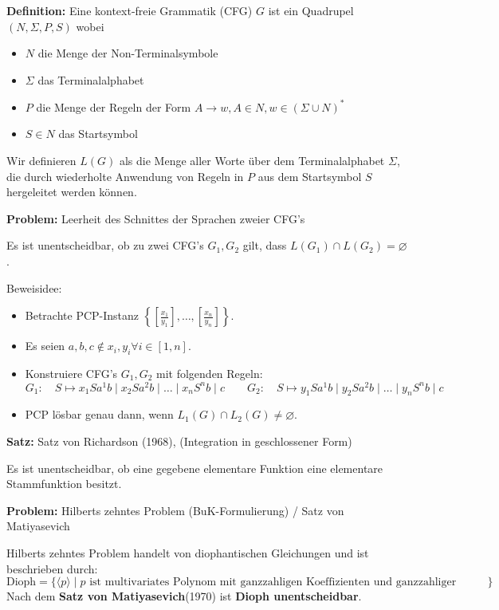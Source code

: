 \documentclass[a4paper,graphics,11pt]{article}
\newcommand{\godel}[1]{\langle #1 \rangle}
\begin{document}
\textbf{Definition:} Eine kontext-freie Grammatik (CFG) $G$ ist ein Quadrupel $(N, \Sigma, P, S)$
wobei
\begin{itemize}
    \item $N$ die Menge der Non-Terminalsymbole
    \item $\Sigma$ das Terminalalphabet
    \item $P$ die Menge der Regeln der Form $A \to w, A \in N, w \in (\Sigma \cup N)^*$
    \item $S \in N$ das Startsymbol
\end{itemize}

Wir definieren $L(G)$ als die Menge aller Worte über dem Terminalalphabet $\Sigma$, die
durch wiederholte Anwendung von Regeln in $P$ aus dem Startsymbol $S$ hergeleitet werden können.

\strut

\textbf{Problem:} Leerheit des Schnittes der Sprachen zweier CFG's

Es ist unentscheidbar, ob zu zwei CFG's $G_1,G_2$ gilt, dass $L(G_1) \cap L(G_2) = \varnothing$.

Beweisidee:
\begin{itemize}
    \item Betrachte PCP-Instanz
        $\displaystyle\left\{\left[\frac{x_1}{y_1}\right],\dots,\left[\frac{x_n}{y_n} \right]\right\}$.\\
    \item Es seien $a,b,c \notin x_i,y_i \forall i \in [1,n]$.
    \item Konstruiere CFG's $G_1,G_2$ mit folgenden Regeln:
        $$
            G_1:\quad S\mapsto x_1Sa^1b \mid x_2 Sa^2b \mid \dots \mid x_n S^nb \mid c
            \qquad
            G_2:\quad S\mapsto y_1Sa^1b \mid y_2 Sa^2b \mid \dots \mid y_n S^nb \mid c
        $$
    \item PCP lösbar genau dann, wenn $L_1(G) \cap L_2(G) \neq \varnothing$.
\end{itemize}

\newpage

\textbf{Satz:} Satz von Richardson (1968), (Integration in geschlossener Form)

Es ist unentscheidbar, ob eine gegebene elementare Funktion eine elementare Stammfunktion besitzt.

\strut

\textbf{Problem:} Hilberts zehntes Problem (BuK-Formulierung) / Satz von Matiyasevich

Hilberts zehntes Problem handelt von diophantischen Gleichungen und ist beschrieben durch:
$$
    \text{Dioph} =  \{\godel{p} \mid p \text{ ist multivariates Polynom mit ganzzahligen Koeffizienten und ganzzahliger Nullstelle}\}
$$
Nach dem \textbf{Satz von Matiyasevich}(1970) ist \textbf{Dioph unentscheidbar}.
\end{document}
